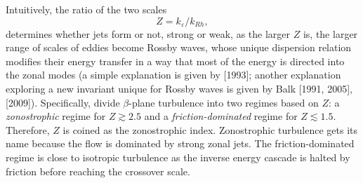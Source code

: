 \documentclass{jfm}
\begin{document}
Intuitively, the ratio of the two scales
\begin{equation}
    Z=k_{\varepsilon}/k_{Rh},\label{eq:zonostrophic_index_def}
\end{equation}
determines whether jets form or not, strong or weak, as the larger
$Z$ is, the larger range of scales of eddies become Rossby waves, whose
unique dispersion relation modifies their energy transfer in a way 
that most of the energy is directed into the zonal modes (a simple explanation 
is given by \citeauthor{Vallis1993}
{[}1993{]}; another explanation exploring a new invariant unique for
Rossby waves is given by \nocite{Balk1991,Balk2005}Balk {[}1991,
2005{]}, \citeauthor{Nazarenko2009} {[}2009{]}).
Specifically, \citet{Galperin2010}
divide $\beta$-plane turbulence into two regimes based on $Z$: 
a \textit{zonostrophic} regime for $Z\gtrsim2.5$ and 
a \textit{friction-dominated} regime for $Z\lesssim1.5$. 
Therefore, $Z$ is coined as the zonostrophic index. 
Zonostrophic turbulence gets its name because the flow
is dominated by strong zonal jets. The friction-dominated
regime is close to isotropic turbulence as the inverse energy cascade
is halted by friction before reaching the crossover scale.
\end{document}
